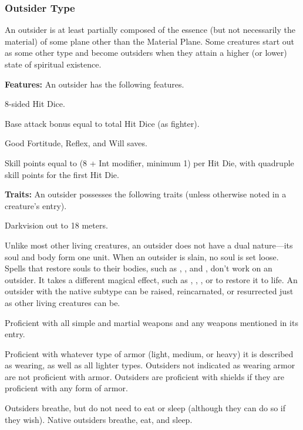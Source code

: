 \subsubsection{Outsider Type}
An outsider is at least partially composed of the essence (but not necessarily the material) of some plane other than the Material Plane. Some creatures start out as some other type and become outsiders when they attain a higher (or lower) state of spiritual existence.

\textbf{Features:} An outsider has the following features.
\begin{itemize*}
\item 8-sided Hit Dice.
\item Base attack bonus equal to total Hit Dice (as fighter).
\item Good Fortitude, Reflex, and Will saves.
\item Skill points equal to (8 + Int modifier, minimum 1) per Hit Die, with quadruple skill points for the first Hit Die.
\end{itemize*}

\textbf{Traits:} An outsider possesses the following traits (unless otherwise noted in a creature's entry).
\begin{itemize*}
\item Darkvision out to 18 meters.
\item Unlike most other living creatures, an outsider does not have a dual nature---its soul and body form one unit. When an outsider is slain, no soul is set loose. Spells that restore souls to their bodies, such as , , and , don't work on an outsider. It takes a different magical effect, such as , , , or  to restore it to life. An outsider with the native subtype can be raised, reincarnated, or resurrected just as other living creatures can be.
\item Proficient with all simple and martial weapons and any weapons mentioned in its entry.
\item Proficient with whatever type of armor (light, medium, or heavy) it is described as wearing, as well as all lighter types. Outsiders not indicated as wearing armor are not proficient with armor. Outsiders are proficient with shields if they are proficient with any form of armor.
\item Outsiders breathe, but do not need to eat or sleep (although they can do so if they wish). Native outsiders breathe, eat, and sleep.
\end{itemize*}

